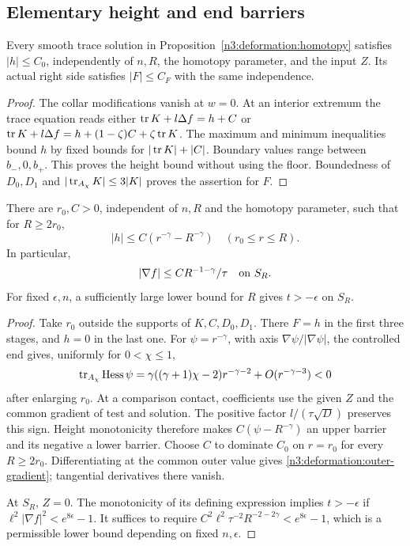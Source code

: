 \subsection{Elementary height and end barriers}

\begin{lemma}\label{n3:deformation:height}
Every smooth trace solution in Proposition~\ref{n3:deformation:homotopy}
satisfies $|h|\le C_0$, independently of $n,R$, the homotopy parameter,
and the input $Z$. Its actual right side satisfies $|F|\le C_F$
with the same independence.
\end{lemma}

\begin{proof}
The collar modifications vanish at $w=0$.
At an interior extremum the trace equation reads either
$\operatorname{tr} K+l\Delta f=h+C$ or
$\operatorname{tr} K+l\Delta f=h+(1-\zeta)C+\zeta\operatorname{tr} K$.
The maximum and minimum inequalities bound $h$ by fixed bounds for
$|\operatorname{tr} K|+|C|$. Boundary values range between $b_-,0,b_+$.
This proves the height bound without using the floor.
Boundedness of $D_0,D_1$ and $|\operatorname{tr}_{A_\chi}K|\le3|K|$ proves the
assertion for $F$.
\end{proof}

\begin{lemma}\label{n3:deformation:end-height}
There are $r_0,C>0$, independent of $n,R$ and the homotopy parameter, such
that for $R\ge2r_0$,
\begin{equation}\label{n3:deformation:end-height-estimate}
 |h|\le C(r^{-\gamma}-R^{-\gamma})\quad(r_0\le r\le R).
\end{equation}
In particular,
\begin{equation}\label{n3:deformation:outer-gradient}
 |\nabla f|\le C R^{-1-\gamma}/\tau\quad\hbox{on }S_R.
\end{equation}
For fixed $\epsilon,n$, a sufficiently large lower bound for $R$ gives
$t>-\epsilon$ on $S_R$.
\end{lemma}

\begin{proof}
Take $r_0$ outside the supports of $K,C,D_0,D_1$.
There $F=h$ in the first three stages, and $h=0$ in the last one.
For $\psi=r^{-\gamma}$, with axis $\nabla\psi/|\nabla\psi|$,
the controlled end gives, uniformly for $0<\chi\le1$,
\[
 \operatorname{tr}_{A_\chi}\operatorname{Hess}\psi
 =\gamma((\gamma+1)\chi-2)r^{-\gamma-2}
      +O(r^{-\gamma-3})<0
\]
after enlarging $r_0$.
At a comparison contact, coefficients use the given $Z$ and the common
gradient of test and solution. The positive factor $l/(\tau\sqrt D)$
preserves this sign. Height monotonicity therefore makes
$C(\psi-R^{-\gamma})$ an upper barrier and its negative a lower barrier.
Choose $C$ to dominate $C_0$ on $r=r_0$ for every $R\ge2r_0$.
Differentiating at the common outer value gives
\eqref{n3:deformation:outer-gradient}; tangential derivatives there vanish.

At $S_R$, $Z=0$. The monotonicity of its defining expression implies
$t>-\epsilon$ if $\ell^2|\nabla f|^2<e^{8\epsilon}-1$.
It suffices to require
$C^2\ell^2\tau^{-2}R^{-2-2\gamma}<e^{8\epsilon}-1$,
which is a permissible lower bound depending on fixed $n,\epsilon$.
\end{proof}

